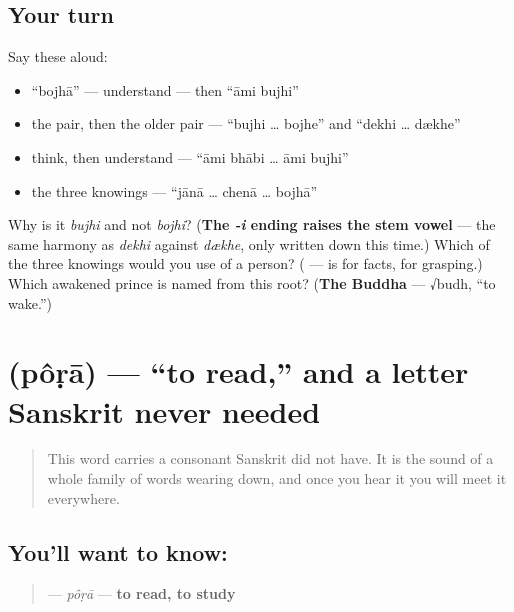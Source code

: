 \subsection*{Your turn}
Say these aloud:

\begin{itemize}
\raggedright
  \item \textquotedblleft{}bojhā\textquotedblright{} — understand — then \textquotedblleft{}āmi bujhi\textquotedblright{}
  \item the pair, then the older pair — \textquotedblleft{}bujhi … bojhe\textquotedblright{} and \textquotedblleft{}dekhi … dækhe\textquotedblright{}
  \item think, then understand — \textquotedblleft{}āmi bhābi … āmi bujhi\textquotedblright{}
  \item the three knowings — \textquotedblleft{}jānā … chenā … bojhā\textquotedblright{}
\end{itemize}

\begin{tcolorbox}[breakable,colback=teal!4,colframe=teal!35!black,title={Before you move on}]
Why is it \emph{bujhi} and not \emph{bojhi}? (\textbf{The \emph{-i} ending raises the stem vowel} — the same harmony as \emph{dekhi} against \emph{dækhe}, only written down this time.) Which of the three knowings would you use of a person? (\textbf{} —  is for facts,  for grasping.) Which awakened prince is named from this root? (\textbf{The Buddha} — √budh, \textquotedblleft{}to wake.\textquotedblright{})
\end{tcolorbox}
\section[pôṛā]{ (pôṛā) — \textquotedblleft{}to read,\textquotedblright{} and a letter Sanskrit never needed}

\label{lesson:BN-C08-pora}



\begin{quote}
This word carries a consonant Sanskrit did not have. It is the sound of a whole family of words wearing down, and once you hear it you will meet it everywhere.
\end{quote}

\subsection*{You'll want to know: }
\begin{quote}
\textbf{} — \emph{pôṛā} — \textbf{to read, to study}
\end{quote}

